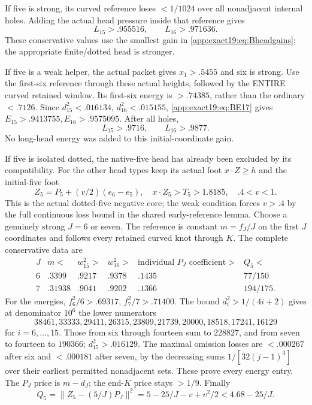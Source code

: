 If five is strong, its curved
reference loses \(<1/1024\) over
all nonadjacent internal holes.
Adding the actual head pressure
inside that reference gives
\[
                   L_{15}>.955516,\qquad L_{16}>.971636 .
\]
These conservative values use the
smallest gain in
\eqref{app:exact19:eq:Bheadgains};
the appropriate finite/dotted head
is stronger.

If five is a weak helper, the
actual packet gives \(x_1>.5455\)
and six is strong.
Use the first-six reference through
these actual heights, followed by
the ENTIRE curved retained window.
Its first-six energy is \(>.74385\),
rather than the ordinary \(<.7126\).
Since \(d_{15}^2<.016134\),
\(d_{16}^2<.015155\),
\eqref{app:exact19:eq:BE17} gives
\(E_{15}>.9413755,E_{16}>.9575095\).
After all holes,
\[
                          L_{15}>.9716,\qquad L_{16}>.9877 .
\]
No long-head energy was added to
this initial-coordinate gain.

If five is isolated dotted,
the native-five head has already
been excluded by its compatibility.
For the other head types keep its
actual foot \(x\cdot Z\ge h\)
and the initial-five foot
\[
 Z_5=P_5+(v/2)(e_6-e_5),\quad
                x\cdot Z_5>T_5>1.8185,\quad .4<v<1 .
\]
This is the actual dotted-five
negative core; the weak condition
forces \(v>.4\) by the full
continuous loss bound in the
shared early-reference lemma.
Choose a genuinely strong
\(J=6\) or seven.
The reference is constant
\(m=f_J/J\) on the first \(J\)
coordinates and follows every
retained curved knot through \(K\).
The complete conservative data are
\[
\begin{array}{c|c|c|c|c|c}
 J&m<&w_{15}^2>&w_{16}^2>&
 \text{individual }P_J\text{ coefficient}>&Q_5<\\ \hline
 6&.3399&.9217&.9378&.1435&77/150\\
 7&.31938&.9041&.9202&.1366&194/175 .
\end{array}
\]
For the energies, \(f_6^2/6>.69317\),
\(f_7^2/7>.71400\).
The bound \(d_i^2>1/(4i+2)\) gives
at denominator \(10^6\) the lower
numerators
\[
38461,33333,29411,26315,23809,21739,
20000,18518,17241,16129
\]
for \(i=6,\ldots,15\).
Those from six through fourteen sum to \(228827\),
and from seven to fourteen to
\(190366\); \(d_{15}^2>.016129\).
The maximal omission losses are
\(<.000267\) after six and
\(<.000181\) after seven, by the
decreasing sums \(1/[32(j-1)^3]\)
over their earliest permitted
nonadjacent sets.
These prove every energy entry.
The \(P_J\) price is \(m-d_J\);
the end-\(K\) price stays \(>1/9\).
Finally
\[
 Q_5=\|Z_5-(5/J)P_J\|^2
          =5-25/J-v+v^2/2<4.68-25/J .
\]


